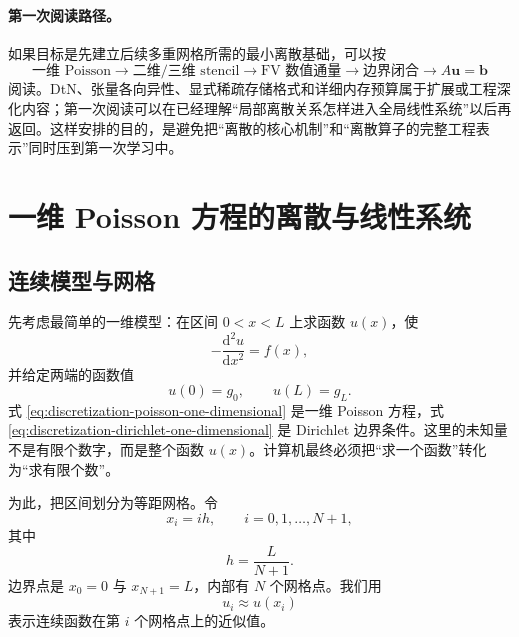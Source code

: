 \paragraph{第一次阅读路径。}
如果目标是先建立后续多重网格所需的最小离散基础，可以按
\begin{equation}
\boxed{
\text{一维 Poisson}
\rightarrow
\text{二维/三维 stencil}
\rightarrow
\text{FV 数值通量}
\rightarrow
\text{边界闭合}
\rightarrow
A\bm u=\bm b
}
\label{eq:discretization-first-pass-path}
\end{equation}
阅读。DtN、张量各向异性、显式稀疏存储格式和详细内存预算属于扩展或工程深化内容；第一次阅读可以在已经理解“局部离散关系怎样进入全局线性系统”以后再返回。这样安排的目的，是避免把“离散的核心机制”和“离散算子的完整工程表示”同时压到第一次学习中。

\section{一维 Poisson 方程的离散与线性系统}

\subsection{连续模型与网格}

先考虑最简单的一维模型：在区间 $0<x<L$ 上求函数 $u(x)$，使
\begin{equation}
-\frac{\mathrm d^2u}{\mathrm dx^2}=f(x),
\label{eq:discretization-poisson-one-dimensional}
\end{equation}
并给定两端的函数值
\begin{equation}
u(0)=g_0,\qquad u(L)=g_L.
\label{eq:discretization-dirichlet-one-dimensional}
\end{equation}
式 \eqref{eq:discretization-poisson-one-dimensional} 是一维 Poisson 方程，式 \eqref{eq:discretization-dirichlet-one-dimensional} 是 Dirichlet 边界条件。这里的未知量不是有限个数字，而是整个函数 $u(x)$。计算机最终必须把“求一个函数”转化为“求有限个数”。

为此，把区间划分为等距网格。令
\begin{equation}
x_i=ih,\qquad i=0,1,\ldots,N+1,
\end{equation}
其中
\begin{equation}
h=\frac{L}{N+1}.
\end{equation}
边界点是 $x_0=0$ 与 $x_{N+1}=L$，内部有 $N$ 个网格点。我们用
\begin{equation}
u_i\approx u(x_i)
\end{equation}
表示连续函数在第 $i$ 个网格点上的近似值。

